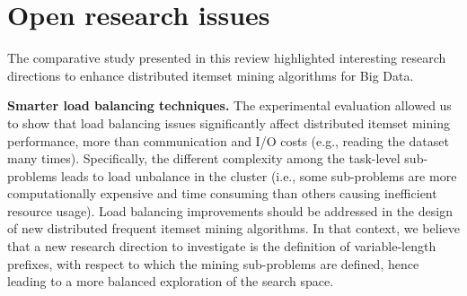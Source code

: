 \section{Open research issues}
\label{survey_openissues}
%



The comparative study presented in this review highlighted interesting research directions to enhance distributed itemset mining algorithms for Big Data.


\textbf{Smarter load balancing techniques.} 
The experimental evaluation allowed us to show that load balancing issues significantly affect distributed itemset mining performance, more than communication and I/O costs (e.g., reading the dataset many times). 
Specifically, the different complexity among the task-level sub-problems leads to load unbalance in the cluster 
(i.e., some sub-problems are more computationally expensive and time consuming than others causing inefficient resource usage).
Load balancing improvements should be addressed in the design of new distributed frequent itemset mining algorithms. 
In that context, we believe that a new research direction to investigate is the definition of variable-length prefixes, 
with respect to which the mining sub-problems are defined, 
hence leading to a more balanced exploration of the search space. 

